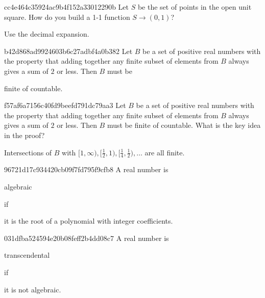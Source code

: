 \begin{note}{cc4e464c35924ac9b4f152a33012290b}
    Let \({ S }\) be the set of points in the open unit square.
    How do you build a 1-1 function \({ S \to (0, 1) }\)?

    \begin{cloze}{1}
        Use the decimal expansion.
    \end{cloze}
\end{note}

\begin{note}{b42d868ad9924603b6c27adbf4a0b382}
    Let \({ B }\) be a set of positive real numbers with the property that adding together any finite subset of elements from \({ B }\) always gives a sum of \({ 2 }\) or less. Then \({ B }\) must be \begin{icloze}{1}finite of countable.\end{icloze}
\end{note}

\begin{note}{f57af6a7156c40fd9beefd791dc79aa3}
    Let \({ B }\) be a set of positive real numbers with the property that adding together any finite subset of elements from \({ B }\) always gives a sum of \({ 2 }\) or less. Then \({ B }\) must be finite of countable.
    What is the key idea in the proof?

    \begin{cloze}{1}
        Intersections of \({ B }\) with \({ [1, \infty), [\frac{1}{2}, 1), [\frac{1}{4}, \frac{1}{2}), \ldots }\) are all finite.
    \end{cloze}
\end{note}

\begin{note}{96721d17c934420cb09f7fd795f9cfb8}
    A real number is \begin{icloze}{2}algebraic\end{icloze} if \begin{icloze}{1}it is the root of a polynomial with integer coefficients.\end{icloze}
\end{note}

\begin{note}{031dfba524594e20b08feff2b4dd08c7}
    A real number is \begin{icloze}{2}transcendental\end{icloze} if \begin{icloze}{1}it is not algebraic.\end{icloze}
\end{note}

